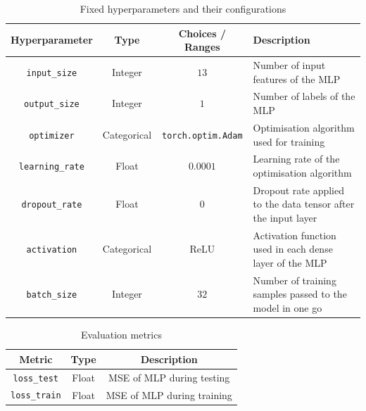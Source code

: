 \begin{table}[H]
    \centering
    \begin{tabular}{|c|c|c|p{5cm}|}
        \hline
        Hyperparameter & Type & Choices / Ranges & Description \\
        \hline
        \small\texttt{input\_size} & Integer & $13$ & Number of input features of the MLP \\
        \hline
        \small\texttt{output\_size} & Integer & $1$ & Number of labels of the MLP \\
        \hline
        \small\texttt{optimizer} & Categorical & \texttt{torch.optim.Adam} & Optimisation algorithm used for training \\
        \hline
        \small\texttt{learning\_rate} & Float & $0.0001$ & Learning rate of the optimisation algorithm \\
        \hline
        \small\texttt{dropout\_rate} & Float & $0$ & Dropout rate applied to the data tensor after the input layer \\
        \hline
        \small\texttt{activation} & Categorical & ReLU & Activation function used in each dense layer of the MLP \\
        \hline
        \small\texttt{batch\_size} & Integer & $32$ & Number of training samples passed to the model in one go \\
        \hline
    \end{tabular}
    \caption{Fixed hyperparameters and their configurations}
    \label{table:experiment_1_fixed_hyperparameters}
\end{table}

\begin{table}[H]
    \centering
    \begin{tabular}{|c|c|c|}
        \hline
        Metric & Type & Description \\
        \hline
        \small\texttt{loss\_test} & Float & MSE of MLP during testing \\
        \hline
        \small\texttt{loss\_train} & Float & MSE of MLP during training \\
        \hline
    \end{tabular}
    \caption{Evaluation metrics}
    \label{table:experiment_1_metric}
\end{table}


